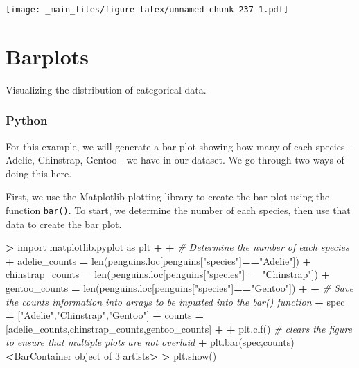 \documentclass[
]{book}
\newenvironment{Shaded}{\begin{snugshade}}{\end{snugshade}}
\newcommand{\BuiltInTok}[1]{#1}
\newcommand{\CommentTok}[1]{\textcolor[rgb]{0.56,0.35,0.01}{\textit{#1}}}
\newcommand{\DecValTok}[1]{\textcolor[rgb]{0.00,0.00,0.81}{#1}}
\newcommand{\ImportTok}[1]{#1}
\newcommand{\NormalTok}[1]{#1}
\newcommand{\OperatorTok}[1]{\textcolor[rgb]{0.81,0.36,0.00}{\textbf{#1}}}
\newcommand{\StringTok}[1]{\textcolor[rgb]{0.31,0.60,0.02}{#1}}
\begin{document}
\texttt{[image: \_main\_files/figure-latex/unnamed-chunk-237-1.pdf]}

\hypertarget{barplots}{%
\section{Barplots}\label{barplots}}

Visualizing the distribution of categorical data.

\hypertarget{python-40}{%
\subsubsection*{Python}\label{python-40}}

For this example, we will generate a bar plot showing how many of each species - Adelie, Chinstrap, Gentoo - we have in our dataset. We go through two ways of doing this here.

First, we use the Matplotlib plotting library to create the bar plot using the function \texttt{bar()}. To start, we determine the number of each species, then use that data to create the bar plot.

\begin{Shaded}
\begin{Highlighting}[]
\OperatorTok{\textgreater{}} \ImportTok{import}\NormalTok{ matplotlib.pyplot }\ImportTok{as}\NormalTok{ plt }
\OperatorTok{+} 
\OperatorTok{+} \CommentTok{\# Determine the number of each species}
\OperatorTok{+}\NormalTok{ adelie\_counts }\OperatorTok{=} \BuiltInTok{len}\NormalTok{(penguins.loc[penguins[}\StringTok{"species"}\NormalTok{]}\OperatorTok{==}\StringTok{"Adelie"}\NormalTok{])}
\OperatorTok{+}\NormalTok{ chinstrap\_counts }\OperatorTok{=} \BuiltInTok{len}\NormalTok{(penguins.loc[penguins[}\StringTok{"species"}\NormalTok{]}\OperatorTok{==}\StringTok{"Chinstrap"}\NormalTok{])}
\OperatorTok{+}\NormalTok{ gentoo\_counts }\OperatorTok{=} \BuiltInTok{len}\NormalTok{(penguins.loc[penguins[}\StringTok{"species"}\NormalTok{]}\OperatorTok{==}\StringTok{"Gentoo"}\NormalTok{])}
\OperatorTok{+} 
\OperatorTok{+} \CommentTok{\# Save the counts information into arrays to be inputted into the bar() function}
\OperatorTok{+}\NormalTok{ spec }\OperatorTok{=}\NormalTok{ [}\StringTok{"Adelie"}\NormalTok{,}\StringTok{"Chinstrap"}\NormalTok{,}\StringTok{"Gentoo"}\NormalTok{]}
\OperatorTok{+}\NormalTok{ counts }\OperatorTok{=}\NormalTok{ [adelie\_counts,chinstrap\_counts,gentoo\_counts]}
\OperatorTok{+} 
\OperatorTok{+}\NormalTok{ plt.clf() }\CommentTok{\# clears the figure to ensure that multiple plots are not overlaid}
\OperatorTok{+}\NormalTok{ plt.bar(spec,counts)}
\OperatorTok{\textless{}}\NormalTok{BarContainer }\BuiltInTok{object}\NormalTok{ of }\DecValTok{3}\NormalTok{ artists}\OperatorTok{\textgreater{}}
\OperatorTok{\textgreater{}}\NormalTok{ plt.show()}
\end{Highlighting}
\end{Shaded}
\end{document}
